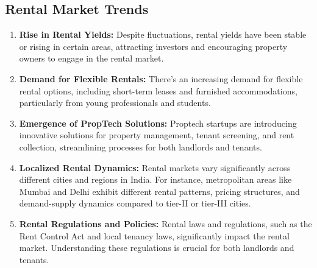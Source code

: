 \subsection{Rental Market Trends}
\begin{enumerate}
      \item \textbf{Rise in Rental Yields:} Despite fluctuations, rental yields have been stable or
            rising in certain areas, attracting investors and encouraging property owners to
            engage in the rental market.
      \item \textbf{Demand for Flexible Rentals:} There's an increasing demand for flexible rental options,
            including short-term leases and furnished accommodations, particularly from young professionals
            and students.
      \item \textbf{Emergence of PropTech Solutions:} Proptech startups are introducing innovative solutions for
            property management, tenant screening, and rent collection, streamlining processes for both landlords
            and tenants.
      \item \textbf{Localized Rental Dynamics:} Rental markets vary significantly across different cities and regions
            in India. For instance, metropolitan areas like Mumbai and Delhi exhibit different rental patterns,
            pricing structures, and demand-supply dynamics compared to tier-II or tier-III cities.
      \item \textbf{Rental Regulations and Policies:} Rental laws and regulations, such as the Rent Control Act and
            local tenancy laws, significantly impact the rental market. Understanding these regulations is crucial
            for both landlords and tenants.~\cite{public-social-rental-housing-in-india}
\end{enumerate}

\bigskip
